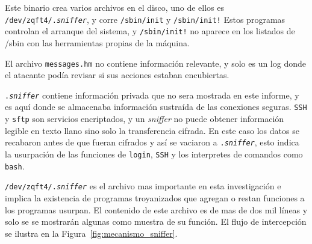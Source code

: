 \vspace{1em}

 Este binario crea varios archivos en el disco, uno de ellos es
\texttt{/dev/zqft4/.\textit{sniffer}}, y corre \texttt{/sbin/init} y \texttt{/sbin/init!} Estos programas
controlan el arranque del sistema, y \texttt{/sbin/init!} no aparece en los
listados de /sbin con las herramientas propias de la máquina.

 El archivo \texttt{messages.hm} no contiene información relevante, y solo es
un log donde el atacante podía revisar si sus acciones estaban
encubiertas.

 \texttt{.\textit{sniffer}} contiene información privada que no sera mostrada en este
informe, y es aquí donde se almacenaba información sustraída de las
conexiones seguras. \texttt{SSH} y \texttt{sftp} son servicios encriptados, y un \textit{sniffer}
no puede obtener información legible en texto llano sino solo la
transferencia cifrada. En este caso los datos se recabaron antes de
que fueran cifrados y así se vaciaron a \texttt{.\textit{sniffer}}, esto indica la
usurpación de las funciones de \texttt{login}, \texttt{SSH} y los interpretes de
comandos como \texttt{bash}.

 \texttt{/dev/zqft4/.\textit{sniffer}} es el archivo mas importante en esta
investigación e implica la existencia de programas troyanizados que
agregan o restan funciones a los programas usurpan. El
contenido de este archivo es de mas de dos mil líneas y solo se
se mostrarán algunas como muestra de su función. El flujo de intercepción se ilustra en la Figura~\ref{fig:mecanismo_sniffer}.

